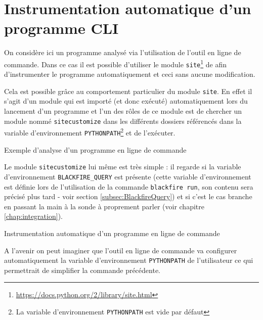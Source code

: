 \section[Programme CLI]{Instrumentation automatique d'un programme CLI}
\label{sec:instru-pythonpath}
On considère ici un programme analysé via l'utilisation de l'outil en ligne de commande. Dans ce cas il est possible d'utiliser le module \verb|site|\footnote{\url{https://docs.python.org/2/library/site.html}} de \Python afin d'instrumenter le programme automatiquement et ceci sans aucune modification.

Cela est possible grâce au comportement particulier du module \verb|site|. En effet il s'agit d'un module qui est importé (et donc exécuté) automatiquement lors du lancement d'un programme \Python et l'un des rôles de ce module est de chercher un module nommé \verb|sitecustomize| dans les différents dossiers référencés dans la variable d'environnement \verb|PYTHONPATH|\footnote{La variable d'environnement \verb?PYTHONPATH? est vide par défaut} et de l'exécuter.

\begin{listing}[H]
\caption{Exemple d'analyse d'un programme en ligne de commande}
\end{listing}

Le module \verb|sitecustomize| lui même est très simple : il regarde si la variable d'environnement \verb|BLACKFIRE_QUERY| est présente (cette variable d'environnement est définie lors de l'utilisation de la commande \verb|blackfire run|, son contenu sera précisé plus tard - voir section \vref{subsec:BlackfireQuery}) et si c'est le cas branche \Blackfire en passant la main à la sonde à proprement parler (voir chapitre \vref{chap:integration}).

\begin{listing}[H]
\caption{Instrumentation automatique d'un programme en ligne de commande}
\end{listing}

\begin{note}
A l'avenir on peut imaginer que l'outil en ligne de commande \Blackfire va configurer automatiquement la variable d'environnement \verb|PYTHONPATH| de l'utilisateur ce qui permettrait de simplifier la commande précédente.
\end{note}

